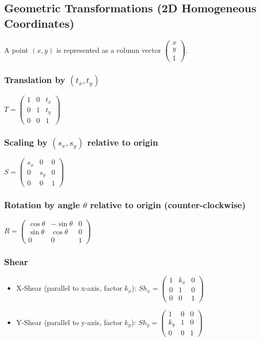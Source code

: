 \subsection*{Geometric Transformations (2D Homogeneous Coordinates)}
A point $(x, y)$ is represented as a column vector $\begin{pmatrix} x \\ y \\ 1 \end{pmatrix}$.

\subsubsection*{Translation by $(t_x, t_y)$}
$T = \begin{pmatrix} 1 & 0 & t_x \\ 0 & 1 & t_y \\ 0 & 0 & 1 \end{pmatrix}$

\subsubsection*{Scaling by $(s_x, s_y)$ relative to origin}
$S = \begin{pmatrix} s_x & 0 & 0 \\ 0 & s_y & 0 \\ 0 & 0 & 1 \end{pmatrix}$

\subsubsection*{Rotation by angle $\theta$ relative to origin (counter-clockwise)}
$R = \begin{pmatrix} \cos\theta & -\sin\theta & 0 \\ \sin\theta & \cos\theta & 0 \\ 0 & 0 & 1 \end{pmatrix}$

\subsubsection*{Shear}
\begin{itemize}
    \item X-Shear (parallel to x-axis, factor $k_x$):
    $Sh_x = \begin{pmatrix} 1 & k_x & 0 \\ 0 & 1 & 0 \\ 0 & 0 & 1 \end{pmatrix}$
    \item Y-Shear (parallel to y-axis, factor $k_y$):
    $Sh_y = \begin{pmatrix} 1 & 0 & 0 \\ k_y & 1 & 0 \\ 0 & 0 & 1 \end{pmatrix}$
\end{itemize}

